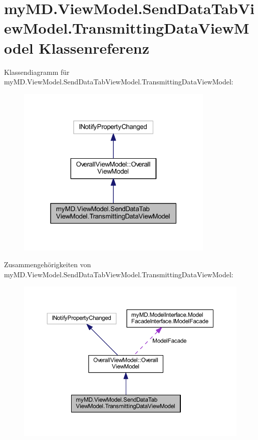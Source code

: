 \hypertarget{classmy_m_d_1_1_view_model_1_1_send_data_tab_view_model_1_1_transmitting_data_view_model}{}\section{my\+M\+D.\+View\+Model.\+Send\+Data\+Tab\+View\+Model.\+Transmitting\+Data\+View\+Model Klassenreferenz}
\label{classmy_m_d_1_1_view_model_1_1_send_data_tab_view_model_1_1_transmitting_data_view_model}


Klassendiagramm für my\+M\+D.\+View\+Model.\+Send\+Data\+Tab\+View\+Model.\+Transmitting\+Data\+View\+Model\+:\nopagebreak
\begin{figure}[H]
\begin{center}
\leavevmode
\includegraphics[width=268pt]{classmy_m_d_1_1_view_model_1_1_send_data_tab_view_model_1_1_transmitting_data_view_model__inherit__graph}
\end{center}
\end{figure}


Zusammengehörigkeiten von my\+M\+D.\+View\+Model.\+Send\+Data\+Tab\+View\+Model.\+Transmitting\+Data\+View\+Model\+:\nopagebreak
\begin{figure}[H]
\begin{center}
\leavevmode
\includegraphics[width=350pt]{classmy_m_d_1_1_view_model_1_1_send_data_tab_view_model_1_1_transmitting_data_view_model__coll__graph}
\end{center}
\end{figure}
